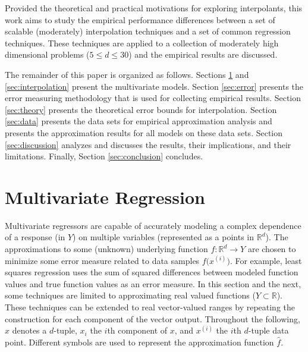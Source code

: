 \documentclass[smallextended,final]{svjour3}       %
\begin{document}
Provided the theoretical and practical motivations for exploring
interpolants, this work aims to study the empirical performance
differences between a set of scalable (moderately) interpolation
techniques and a set of common regression techniques. These techniques
are applied to a collection of moderately high dimensional problems
($5 \le d \le 30$) and the empirical results are discussed.

The remainder of this paper is organized as follows. Sections
\ref{sec:regression} and \ref{sec:interpolation} present the
multivariate models. Section \ref{sec:error} presents the error
measuring methodology that is used for collecting empirical
results. Section \ref{sec:theory} presents the theoretical error
bounds for interpolation. Section \ref{sec:data} presents the data
sets for empirical approximation analysis and presents the
approximation results for all models on these data sets. Section
\ref{sec:discussion} analyzes and discusses the results, their
implications, and their limitations. Finally, Section
\ref{sec:conclusion} concludes.



\section{Multivariate Regression}
\label{sec:regression}
Multivariate regressors are capable of accurately modeling a complex
dependence of a response (in $Y$) on multiple variables (represented
as a points in $\mathbb{R}^{d}$). The approximations to some (unknown)
underlying function $f: \mathbb{R}^d \rightarrow Y$ are chosen to
minimize some error measure related to data samples
$f\bigl(x^{(i)}\bigr)$. For example, least squares regression uses the
sum of squared differences between modeled function values and true
function values as an error measure. In this section and the next,
some techniques are limited to approximating real valued functions ($Y
\subset \mathbb{R}$). These techniques can be extended to real
vector-valued ranges by repeating the construction for each component
of the vector output. Throughout the following, $x$ denotes a
$d$-tuple, $x_i$ the $i$th component of $x$, and $x^{(i)}$ the $i$th
$d$-tuple data point. Different symbols are used to represent the
approximation function $\hat f$.
\end{document}

